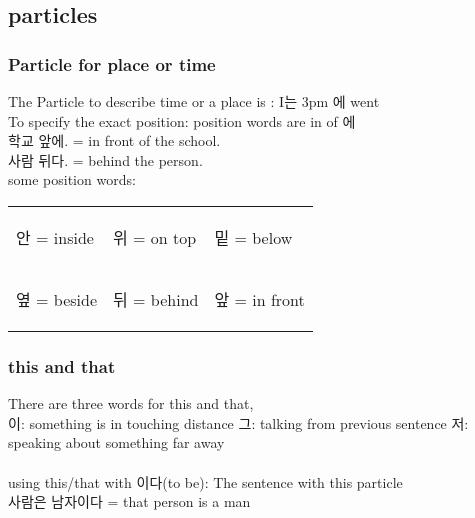 	



\subsection{particles}

\subsubsection{Particle for place or time}
\begin{Korean}
The Particle to describe time or a place is : I는 3pm 에 went \\
To specify the exact position: position words are in  of 에\\
학교 앞에. = in front of the school.\\
사람 뒤다. = behind the person.\\
some position words:\\
\begin{tabular}{lll}
\hline
\begin{Korean}안 = inside\end{Korean}&\begin{Korean}위 = on top\end{Korean}&\begin{Korean}밑 = below\end{Korean}\\
\begin{Korean}옆 = beside\end{Korean}&\begin{Korean}뒤 = behind\end{Korean}&\begin{Korean}앞 = in front\end{Korean}\\
\hline
\end{tabular}
\end{Korean}

\subsubsection{this and that}
\begin{Korean}
There are three words for this and that, \\
	이: something is in touching distance\newline
	그: talking from previous sentence\newline
	저: speaking about something far away\\\\
using this/that with  이다(to be): The sentence  with this particle \\
사람은 남자이다 = that person is a man
\end{Korean}

